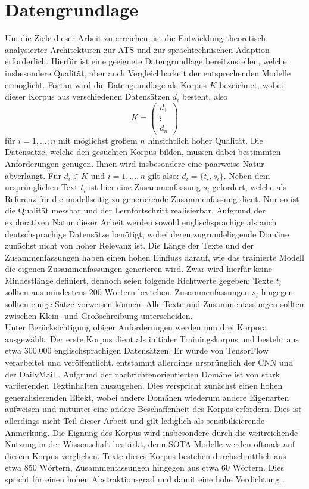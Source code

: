 \chapter{Datengrundlage}
\thispagestyle{fancy}
\label{chap:Datengrundlage}

\noindent
Um die Ziele dieser Arbeit zu erreichen, ist die Entwicklung theoretisch analysierter Architekturen zur \ac{ATS} und zur sprachtechnischen Adaption erforderlich. Hierfür ist eine geeignete Datengrundlage bereitzustellen, welche insbesondere Qualität, aber auch Vergleichbarkeit der entsprechenden Modelle ermöglicht. Fortan wird die Datengrundlage als Korpus $K$ bezeichnet, wobei dieser Korpus aus verschiedenen Datensätzen $d_i$ besteht, also $$K=\begin{pmatrix} d_1 \\ \vdots \\ d_n \end{pmatrix}$$ für $i=1,...,n$ mit möglichst großem $n$ hinsichtlich hoher Qualität. Die Datensätze, welche den gesuchten Korpus bilden, müssen dabei bestimmten Anforderungen genügen. Ihnen wird insbesondere eine paarweise Natur abverlangt. Für $d_i \in K$ und $i=1,...,n$ gilt also: $d_i=\{t_i,s_i\}$. Neben dem ursprünglichen Text $t_i$ ist hier eine Zusammenfassung $s_i$ gefordert, welche als Referenz für die modellseitig zu generierende Zusammenfassung dient. Nur so ist die Qualität messbar und der Lernfortschritt realisierbar. Aufgrund der explorativen Natur dieser Arbeit werden sowohl englischsprachige als auch deutschsprachige Datensätze benötigt, wobei deren zugrundeliegende Domäne zunächst nicht von hoher Relevanz ist. Die Länge der Texte und der Zusammenfassungen haben einen hohen Einfluss darauf, wie das trainierte Modell die eigenen Zusammenfassungen generieren wird. Zwar wird hierfür keine Mindestlänge definiert, dennoch seien folgende Richtwerte gegeben: Texte $t_i$ sollten aus mindestens 200 Wörtern bestehen. Zusammenfassungen $s_i$ hingegen sollten einige Sätze vorweisen können. Alle Texte und Zusammenfassungen sollten zwischen Klein- und Großschreibung unterscheiden.\\

\noindent
Unter Berücksichtigung obiger Anforderungen werden nun drei Korpora ausgewählt. Der erste Korpus dient als initialer Trainingskorpus und besteht aus etwa 300.000 englischsprachigen Datensätzen. Er wurde von TensorFlow verarbeitet und veröffentlicht, entstammt allerdings ursprünglich der CNN und der DailyMail \cite{TEN21}. Aufgrund der nachrichtenorientierten Domäne ist von stark variierenden Textinhalten auszugehen. Dies verspricht zunächst einen hohen generalisierenden Effekt, wobei andere Domänen wiederum andere Eigenarten aufweisen und mitunter eine andere Beschaffenheit des Korpus erfordern. Dies ist allerdings nicht Teil dieser Arbeit und gilt lediglich als sensibilisierende Anmerkung. Die Eignung des Korpus wird insbesondere durch die weitreichende Nutzung in der Wissenschaft bestärkt, denn \ac{SOTA}-Modelle werden oftmals auf diesem Korpus verglichen. Texte dieses Korpus bestehen durchschnittlich aus etwa 850 Wörtern, Zusammenfassungen hingegen aus etwa 60 Wörtern. Dies spricht für einen hohen Abstraktionsgrad und damit eine hohe Verdichtung \cite[S.~6]{ROT20}.\\

